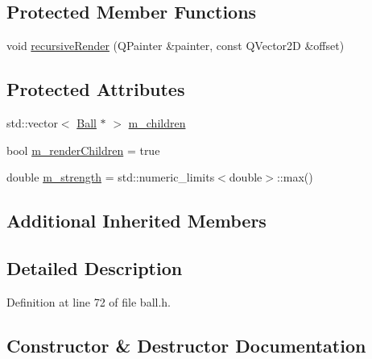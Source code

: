 \subsection*{Protected Member Functions}
\begin{DoxyCompactItemize}
\item 
void \mbox{\hyperlink{class_composite_ball_a05f96cd1c4321d89763dce5a15b53138}{recursive\+Render}} (Q\+Painter \&painter, const Q\+Vector2D \&offset)
\end{DoxyCompactItemize}
\subsection*{Protected Attributes}
\begin{DoxyCompactItemize}
\item 
std\+::vector$<$ \mbox{\hyperlink{class_ball}{Ball}} $\ast$ $>$ \mbox{\hyperlink{class_composite_ball_a2689ad5361a52d586f43dafd8922a422}{m\+\_\+children}}
\item 
bool \mbox{\hyperlink{class_composite_ball_a751e10b0f9278bcf48720ac6af9bdd20}{m\+\_\+render\+Children}} = true
\item 
double \mbox{\hyperlink{class_composite_ball_a78051a7a01a600b88ed22e7d725640db}{m\+\_\+strength}} = std\+::numeric\+\_\+limits$<$double$>$\+::max()
\end{DoxyCompactItemize}
\subsection*{Additional Inherited Members}


\subsection{Detailed Description}


Definition at line 72 of file ball.\+h.



\subsection{Constructor \& Destructor Documentation}
\mbox{\label{class_composite_ball_a7b6224c07ad69240377555508ddc8876}} 
